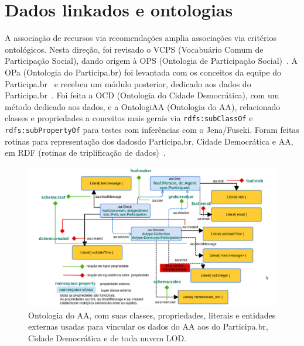 \documentclass[a4paper, 11pt]{article} %
\begin{document}
\section*{Dados linkados e ontologias}
A associação de recursos via recomendações amplia associações via critérios ontológicos. Nesta direção, foi revisado o VCPS (Vocabuário Comum de Participação Social), dando origem à OPS (Ontologia de Participação Social)~\cite{OPS}. A OPa (Ontologia do Participa.br) foi levantada com os conceitos da equipe do Participa.br~\cite{OPA} e recebeu um módulo posterior, dedicado aos dados do Participa.br~\cite{pnud5}. Foi feita a OCD (Ontologia do Cidade Democrática), com um método dedicado aos dados, e a OntologiAA (Ontologia do AA), relacionado classes e propriedades a conceitos mais gerais via \texttt{rdfs:subClassOf} e \texttt{rdfs:subPropertyOf} para testes com inferências com o Jena/Fuseki. Foram feitas rotinas para representação dos dadosdo Participa.br, Cidade Democrática e AA, em RDF (rotinas de triplificação de dados)~\cite{pnud5}.
\begin{figure}[h!]
  \centering
    \includegraphics[width=1.\textwidth]{ontologiaa.png}
  \caption{\small Ontologia do AA, com suas classes, propriedades, literais e entidades externas usadas para vincular os dados do AA aos do Participa.br, Cidade Democrática e de toda nuvem LOD.}\label{fig:ontologiaa}
\end{figure}
\end{document}
